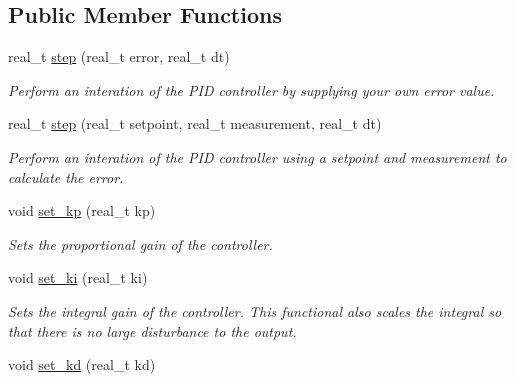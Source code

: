 \subsection*{Public Member Functions}
\begin{DoxyCompactItemize}
\item 
real\-\_\-t \hyperlink{classetk_1_1_p_i_d_controller_af9e7e48086781b0060dd14ed6c9e135b}{step} (real\-\_\-t error, real\-\_\-t dt)
\begin{DoxyCompactList}\small\item\em Perform an interation of the P\-I\-D controller by supplying your own error value. \end{DoxyCompactList}\item 
real\-\_\-t \hyperlink{classetk_1_1_p_i_d_controller_ac17af5228b2cb3817cf72faccbdc4cd0}{step} (real\-\_\-t setpoint, real\-\_\-t measurement, real\-\_\-t dt)
\begin{DoxyCompactList}\small\item\em Perform an interation of the P\-I\-D controller using a setpoint and measurement to calculate the error. \end{DoxyCompactList}\item 
\hypertarget{classetk_1_1_p_i_d_controller_a73aecfcfe6e450178af4ec276abe8086}{void \hyperlink{classetk_1_1_p_i_d_controller_a73aecfcfe6e450178af4ec276abe8086}{set\-\_\-kp} (real\-\_\-t kp)}\label{classetk_1_1_p_i_d_controller_a73aecfcfe6e450178af4ec276abe8086}

\begin{DoxyCompactList}\small\item\em Sets the proportional gain of the controller. \end{DoxyCompactList}\item 
\hypertarget{classetk_1_1_p_i_d_controller_a6112e212a37ed7a2950c62f558cc489c}{void \hyperlink{classetk_1_1_p_i_d_controller_a6112e212a37ed7a2950c62f558cc489c}{set\-\_\-ki} (real\-\_\-t ki)}\label{classetk_1_1_p_i_d_controller_a6112e212a37ed7a2950c62f558cc489c}

\begin{DoxyCompactList}\small\item\em Sets the integral gain of the controller. This functional also scales the integral so that there is no large disturbance to the output. \end{DoxyCompactList}\item 
\hypertarget{classetk_1_1_p_i_d_controller_a1e5de9c92d5ceb2d1a94c87e1f118631}{void \hyperlink{classetk_1_1_p_i_d_controller_a1e5de9c92d5ceb2d1a94c87e1f118631}{set\-\_\-kd} (real\-\_\-t kd)}\label{classetk_1_1_p_i_d_controller_a1e5de9c92d5ceb2d1a94c87e1f118631}


\end{DoxyCompactItemize}
